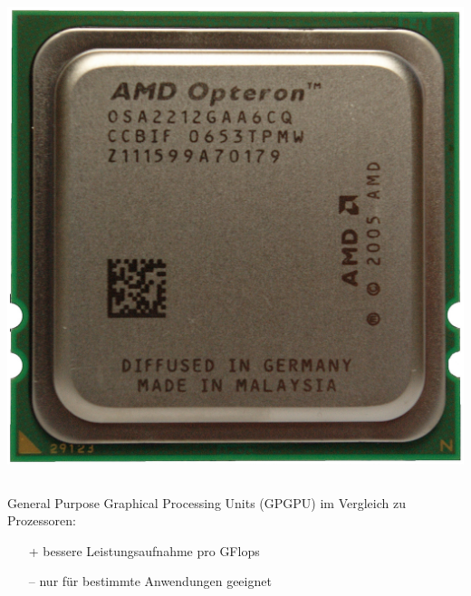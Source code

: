\begin{frame}
\begin{columns}
\begin{column}{0.5\linewidth}
        \centerline{\includegraphics[height=0.3\textheight]{AMD_Opteron_2212_IMGP1795.jpg}}
    \end{column}\end{columns}
    General Purpose Graphical Processing Units (GPGPU) im Vergleich zu Prozessoren:
    \begin{itemize}
        \item[+] bessere Leistungsaufnahme pro GFlops
        \item[–] nur für bestimmte Anwendungen geeignet

\end{itemize}
\end{frame}
